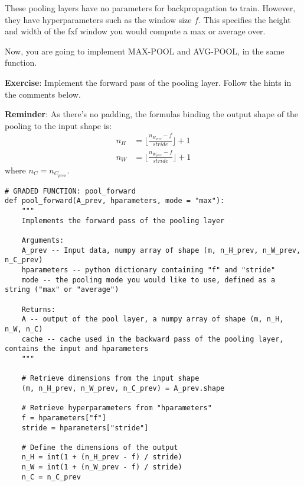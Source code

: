 {\begin{itemize}
\end{itemize}

These pooling layers have no parameters for backpropagation to train. However, they have hyperparameters such as the window size $f$. This specifies the height and width of the fxf window you would compute a max or average over. 




Now, you are going to implement MAX-POOL and AVG-POOL, in the same function. 

{\textbf {Exercise}}: Implement the forward pass of the pooling layer. Follow the hints in the comments below.

{\textbf {Reminder}}:
As there's no padding, the formulas binding the output shape of the pooling to the input shape is:
\begin{equation}
\begin{aligned}
n_H &= \lfloor \frac{n_{H_{prev}} - f}{stride} \rfloor +1 \\
n_W &= \lfloor \frac{n_{W_{prev}} - f}{stride} \rfloor +1 
\end{aligned}
\end{equation}
where $ n_C = n_{C_{prev}}$.

\begin{verbatim}
# GRADED FUNCTION: pool_forward
def pool_forward(A_prev, hparameters, mode = "max"):
    """
    Implements the forward pass of the pooling layer
    
    Arguments:
    A_prev -- Input data, numpy array of shape (m, n_H_prev, n_W_prev, n_C_prev)
    hparameters -- python dictionary containing "f" and "stride"
    mode -- the pooling mode you would like to use, defined as a string ("max" or "average")
    
    Returns:
    A -- output of the pool layer, a numpy array of shape (m, n_H, n_W, n_C)
    cache -- cache used in the backward pass of the pooling layer, contains the input and hparameters 
    """
    
    # Retrieve dimensions from the input shape
    (m, n_H_prev, n_W_prev, n_C_prev) = A_prev.shape
    
    # Retrieve hyperparameters from "hparameters"
    f = hparameters["f"]
    stride = hparameters["stride"]
    
    # Define the dimensions of the output
    n_H = int(1 + (n_H_prev - f) / stride)
    n_W = int(1 + (n_W_prev - f) / stride)
    n_C = n_C_prev
    

\end{verbatim}}

